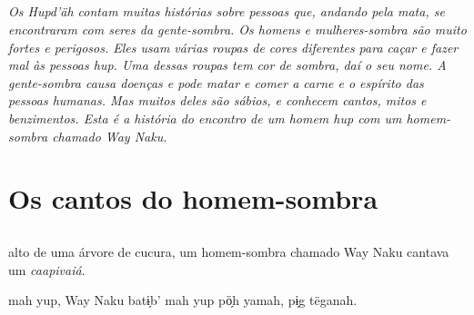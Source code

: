 \chapter*{}
\thispagestyle{empty}

\vspace*{\fill}
\textit{Os Hupd'äh contam muitas histórias sobre pessoas que, andando pela mata, se
encontraram com seres da gente-sombra. Os homens e mulheres-sombra são muito fortes e perigosos. Eles usam várias roupas de cores diferentes para caçar e fazer mal às pessoas hup. Uma dessas roupas tem cor de sombra, daí o seu nome. A gente-sombra causa doenças e pode matar e comer a carne e o espírito das pessoas humanas. Mas muitos deles são sábios, e conhecem cantos, mitos e benzimentos. Esta é a história do encontro de um homem hup com um homem-sombra chamado Way Naku.}
\vspace*{\fill}

\openany

\blankpage
\part{Os cantos do homem-sombra}


\chapter*{}
\mbox{}\vspace*{\fill}

\begingroup\raggedright\setlength{\linewidth}{.6\linewidth}


 alto de uma árvore de
cucura, um homem-sombra
chamado Way Naku cantava
um \textit{caapivaiá}.

\vspace{2em}

 mah yup, Way Naku
batɨ̗b’ mah yup pö̗h yamah,
pɨ̗g tëganah.

\vspace*{\fill}

